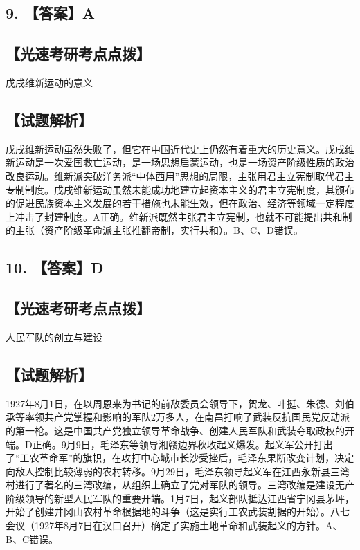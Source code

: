 \documentclass[UTF8,11pt]{ctexart}
\begin{document}
\subsection*{9. 【答案】A}

\subsection*{【光速考研考点点拨】}

戊戌维新运动的意义


\subsection*{【试题解析】}

戊戌维新运动虽然失败了，但它在中国近代史上仍然有着重大的历史意义。戊戌维新运动是一次爱国救亡运动，是一场思想启蒙运动，也是一场资产阶级性质的政治改良运动。维新派突破洋务派“中体西用”思想的局限，主张用君主立宪制取代君主专制制度。戊戌维新运动虽然未能成功地建立起资本主义的君主立宪制度，其颁布的促进民族资本主义发展的若干措施也未能生效，但在政治、经济等领域一定程度上冲击了封建制度。A正确。维新派既然主张君主立宪制，也就不可能提出共和制的主张（资产阶级革命派主张推翻帝制，实行共和）。B、C、D错误。


\subsection*{10. 【答案】D}

\subsection*{【光速考研考点点拨】}

人民军队的创立与建设


\subsection*{【试题解析】}

1927年8月1日，在以周恩来为书记的前敌委员会领导下，贺龙、叶挺、朱德、刘伯承等率领共产党掌握和影响的军队2万多人，在南昌打响了武装反抗国民党反动派的第一枪。这是中国共产党独立领导革命战争、创建人民军队和武装夺取政权的开端。D正确。9月9日，毛泽东等领导湘赣边界秋收起义爆发。起义军公开打出了“工农革命军”的旗帜，在攻打中心城市长沙受挫后，毛泽东果断改变计划，决定向敌人控制比较薄弱的农村转移。9月29日，毛泽东领导起义军在江西永新县三湾村进行了著名的三湾改编，从组织上确立了党对军队的领导。三湾改编是建设无产阶级领导的新型人民军队的重要开端。1月7日，起义部队抵达江西省宁冈县茅坪，开始了创建井冈山农村革命根据地的斗争（这是实行工农武装割据的开始）。八七会议（1927年8月7日在汉口召开）确定了实施土地革命和武装起义的方针。A、B、C错误。
\end{document}
